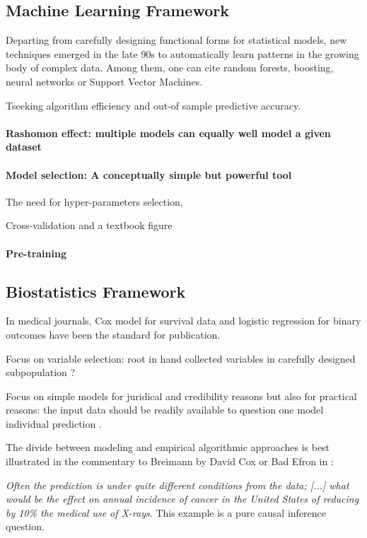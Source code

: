 \documentclass[french,12pt,twoside,a4paper]{book}
\begin{document}
\begin{background_box_left}

  \subsection{Machine Learning Framework}\label{subsec:intro:machine_learning}

  Departing from carefully designing functional forms for statistical models,
  new techniques emerged in the late 90s to automatically learn patterns in the
  growing body of complex data. Among them, one can cite random forests,
  boosting, neural networks or Support Vector Machines.


  Tseeking algorithm efficiency and out-of sample predictive accuracy.


  \paragraph{Rashomon effect: multiple models can equally well model a given dataset}

  \paragraph{Model selection: A conceptually simple but powerful tool}

  The need for hyper-parameters selection,

  Cross-validation \citep{stone1974cross} and a textbook figure

  \paragraph{Pre-training}


  \subsection{Biostatistics Framework}\label{subsec:intro:biostatistics_framework}

  In medical journals, Cox model for survival data and logistic regression for
  binary outcomes have been the standard for publication.

  Focus on variable selection: root in hand collected variables in carefully
  designed subpopulation ?

  Focus on simple models for juridical and credibility reasons but also for
  practical reasons: the input data should be readily available to question one
  model individual prediction \citep{wyatt1995commentary}.

  The divide between modeling and empirical algorithmic approaches is best
  illustrated in the commentary to Breimann by David Cox or Bad Efron in  \cite{}:

  \textit{Often the prediction is under quite different conditions from the
  data; [...] what would be the effect on annual incidence of cancer in the
  United States of reducing by 10\% the medical use of X-rays}. This example is
  a pure causal inference question.

\end{background_box_left}
\end{document}
